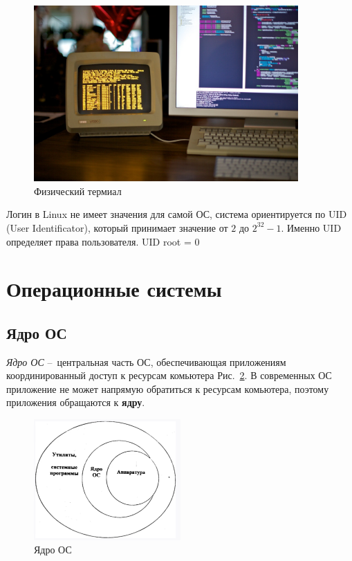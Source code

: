\documentclass[oneside, final, 14pt]{extreport} %
\begin{document}
\begin{figure}[ht]
    \centering
    \includegraphics[width=0.9\textwidth]{6.png}
    \caption{Физический термиал}
    \label{fig:6}
\end{figure}

Логин в Linux не имеет значения для самой ОС, система ориентируется по UID (User Identificator), 
который принимает значение от $2$ до  $2^{32} - 1 $. Именно UID определяет права пользователя.
UID root = 0

\section{Операционные системы}

\subsection{Ядро ОС}

\textit{Ядро ОС} – центральная часть ОС, обеспечивающая приложениям 
координированный доступ к ресурсам комьютера Рис.~\ref{fig:3}. 
В современных ОС приложение не может напрямую обратиться 
к ресурсам комьютера, поэтому приложения обращаются к \textbf{ядру}.

\begin{figure}[ht]
    \centering
    \includegraphics[width=0.5\textwidth]{3.png}
    \caption{Ядро ОС}
    \label{fig:3}
\end{figure}
\end{document}
